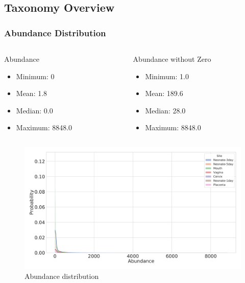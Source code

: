 \documentclass{beamer}
\begin{document}
    \subsection{Taxonomy Overview}
    \begin{frame}
        \frametitle{Abundance Distribution}

        \begin{columns}
            \begin{column}{0.4 \linewidth}
                \begin{block}{Abundance}
                    \begin{itemize}
                        \item Minimum: 0
                        \item Mean: 1.8
                        \item Median: 0.0
                        \item Maximum: 8848.0
                    \end{itemize}
                \end{block}
            \end{column}

            \begin{column}{0.4 \linewidth}
                \begin{block}{Abundance without Zero}
                    \begin{itemize}
                        \item Minimum: 1.0
                        \item Mean: 189.6
                        \item Median: 28.0
                        \item Maximum: 8848.0
                    \end{itemize}
                \end{block}
            \end{column}
        \end{columns}

        \begin{figure}
            \includegraphics[width=0.5 \linewidth]{figures/Step53/everything.DADA2.homd.uncorrected.pdf}
            \caption{Abundance distribution}
        \end{figure}
    \end{frame}
\end{document}
